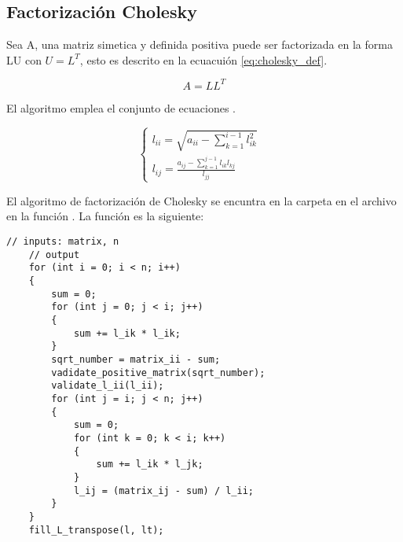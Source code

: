 \subsection{Factorización Cholesky}

Sea A, una matriz simetica y definida positiva puede ser factorizada en la forma LU con $U=L^T$, esto es descrito en la ecuacuión \ref{eq:cholesky_def}.

\begin{equation}
    A=LL^T \label{eq:cholesky_def}
\end{equation}

El algoritmo emplea el conjunto de ecuaciones .

\begin{equation}
    \begin{cases}
        l_{ii} = \sqrt{a_{ii}- \sum\limits_{k=1}^{i-1} l_{ik}^2}           & \\
        l_{ij} = \frac{a_{ij}-\sum\limits_{k=1}^{j-1}l_{ik}l_{kj}}{l_{jj}} &
    \end{cases}
\end{equation}

El algoritmo de factorización de Cholesky se encuntra en la carpeta  en el archivo  en la función . La función es la siguiente:

\begin{lstlisting}[style=CStyle]
    // inputs: matrix, n
    // output
    for (int i = 0; i < n; i++)
    {
        sum = 0;
        for (int j = 0; j < i; j++)
        {
            sum += l_ik * l_ik;
        }
        sqrt_number = matrix_ii - sum;
        vadidate_positive_matrix(sqrt_number);
        validate_l_ii(l_ii);
        for (int j = i; j < n; j++)
        {
            sum = 0;
            for (int k = 0; k < i; k++)
            {
                sum += l_ik * l_jk;
            }
            l_ij = (matrix_ij - sum) / l_ii;
        }
    }
    fill_L_transpose(l, lt);
\end{lstlisting}
